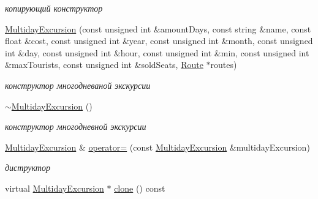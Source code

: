\begin{DoxyCompactItemize}
\begin{DoxyCompactList}\small\item\em копирующий конструктор \end{DoxyCompactList}\item 
\hypertarget{class_multiday_excursion_a976b2d33561989ae2febedcb9de2c9b6}{}\hyperlink{class_multiday_excursion_a976b2d33561989ae2febedcb9de2c9b6}{Multiday\+Excursion} (const unsigned int \&amount\+Days, const string \&name, const float \&cost, const unsigned int \&year, const unsigned int \&month, const unsigned int \&day, const unsigned int \&hour, const unsigned int \&min, const unsigned int \&max\+Tourists, const unsigned int \&sold\+Seats, \hyperlink{class_route}{Route} $\ast$routes)\label{class_multiday_excursion_a976b2d33561989ae2febedcb9de2c9b6}

\begin{DoxyCompactList}\small\item\em конструктор многодневаной экскурсии \end{DoxyCompactList}\item 
\hypertarget{class_multiday_excursion_acdfb7139fe048a79c722bd2ec7cf6826}{}\hyperlink{class_multiday_excursion_acdfb7139fe048a79c722bd2ec7cf6826}{$\sim$\+Multiday\+Excursion} ()\label{class_multiday_excursion_acdfb7139fe048a79c722bd2ec7cf6826}

\begin{DoxyCompactList}\small\item\em конструктор многодневной экскурсии \end{DoxyCompactList}\item 
\hypertarget{class_multiday_excursion_ae9bbf0deba8c6c92b0c735f329df33dc}{}\hyperlink{class_multiday_excursion}{Multiday\+Excursion} \& \hyperlink{class_multiday_excursion_ae9bbf0deba8c6c92b0c735f329df33dc}{operator=} (const \hyperlink{class_multiday_excursion}{Multiday\+Excursion} \&multiday\+Excursion)\label{class_multiday_excursion_ae9bbf0deba8c6c92b0c735f329df33dc}

\begin{DoxyCompactList}\small\item\em диструктор \end{DoxyCompactList}\item 
\hypertarget{class_multiday_excursion_a21290677ebe9b924ed9e1d6cdb72d2c9}{}virtual \hyperlink{class_multiday_excursion}{Multiday\+Excursion} $\ast$ \hyperlink{class_multiday_excursion_a21290677ebe9b924ed9e1d6cdb72d2c9}{clone} () const \label{class_multiday_excursion_a21290677ebe9b924ed9e1d6cdb72d2c9}


\end{DoxyCompactItemize}
